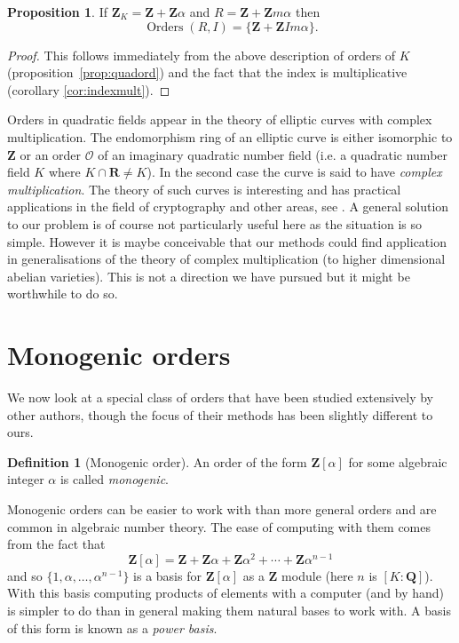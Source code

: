 \documentclass[12pt,a4paper,abstracton,bibtotoc]{scrreprt}
\theoremstyle{definition}
\newtheorem{prop}{Proposition}
\newtheorem{defn}{Definition}
\newcommand{\QQ}{\mathbf{Q}}
\newcommand{\RR}{\mathbf{R}}
\newcommand{\ZZ}{\mathbf{Z}}
\renewcommand{\O}{\mathcal{O}}
\DeclareMathOperator{\Orders}{Orders}
\begin{document}
\begin{prop}
If $\ZZ_K = \ZZ + \ZZ\alpha$ and $R = \ZZ + \ZZ m\alpha$ then
\[
\Orders(R, I) = \{\ZZ + \ZZ Im\alpha\}.
\]
\end{prop}
\begin{proof}
This follows immediately from the above description of orders of $K$ (proposition~\ref{prop:quadord}) and the fact that the index is multiplicative (corollary \ref{cor:indexmult}).
\end{proof}

Orders in quadratic fields appear in the theory of elliptic curves with complex multiplication.
The endomorphism ring of an elliptic curve is either isomorphic to $\ZZ$ or an order $\O$ of an imaginary quadratic number field (i.e. a quadratic number field $K$ where $K\cap \RR \ne K$).
In the second case the curve is said to have \emph{complex multiplication}.
The theory of such curves is interesting and has practical applications in the field of cryptography and other areas, see \cite{schertz}.
A general solution to our problem is of course not particularly useful here as the situation is so simple.
However it is maybe conceivable that our methods could find application in generalisations of the theory of complex multiplication (to higher dimensional abelian varieties).
This is not a direction we have pursued but it might be worthwhile to do so.


\section{Monogenic orders}
\label{sec:monogenic}
We now look at a special class of orders that have been studied extensively by other authors, though the focus of their methods has been slightly different to ours.

\begin{defn}[Monogenic order]
An order of the form $\ZZ[\alpha]$ for some algebraic integer $\alpha$ is called \emph{monogenic}.
\end{defn}

Monogenic orders can be easier to work with than more general orders and are common in algebraic number theory.
The ease of computing with them comes from the fact that
\[
\ZZ[\alpha] = \ZZ + \ZZ\alpha + \ZZ\alpha^2 + \cdots + \ZZ\alpha^{n-1}
\]
and so $\{1,\alpha,\ldots,\alpha^{n-1}\}$ is a basis for $\ZZ[\alpha]$ as a $\ZZ$ module (here $n$ is $[K : \QQ]$).
With this basis computing products of elements with a computer (and by hand) is simpler to do than in general making them natural bases to work with.
A basis of this form is known as a \emph{power basis}.
\end{document}

